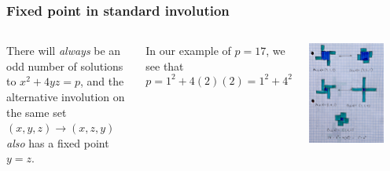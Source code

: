 \documentclass{beamer}
\begin{document}
\begin{frame}
	\frametitle{Fixed point in standard involution}

	\begin{columns}

	There will {\em always} be an odd number of solutions to $x^2+4yz = p$, and the
	alternative involution on the same set $(x,y,z) \rightarrow (x,z,y)$ {\em also} has a fixed
	point $y = z$.

	\vspace{1ex}
	In our example of $p=17$, we see that 
	\[ p = 1^2 + 4(2)(2) = 1^2 + 4^2 \]
	

	\begin{center}
             \includegraphics[width=0.8\textwidth]{basic_involution_levels.jpg}
        \end{center}


	\end{columns}
\end{frame}
\end{document}
